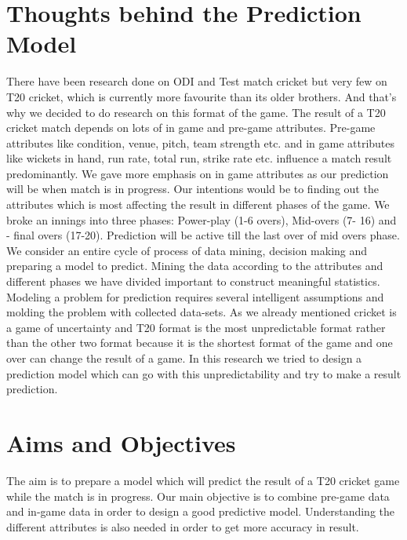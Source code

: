 \section{Thoughts behind the Prediction Model } 
There have been research done on ODI and Test match cricket but very few on T20 cricket, which is currently more favourite than its older brothers. And that's why we decided to do research on this format of the game. The result of a T20 cricket match depends on lots of in game and pre-game attributes. Pre-game attributes like condition, venue, pitch, team strength etc. and in game attributes like wickets in hand, run rate, total run, strike rate etc. influence a match result predominantly. We gave more emphasis on in game attributes as our prediction will be when match is in progress. Our intentions would be to finding out the attributes which is most affecting the result in different phases of the game. We broke an innings into three phases: Power-play (1-6 overs), Mid-overs (7- 16) and - final overs (17-20). Prediction will be active till the last over of mid overs phase. We consider an entire cycle of process of data mining, decision making and preparing a model to predict. Mining the data according to the attributes and different phases we have divided important to construct meaningful statistics. Modeling a problem for prediction requires several intelligent assumptions and molding the problem with collected data-sets. As we already mentioned cricket is a game of uncertainty and T20 format is the most unpredictable format rather than the other two format because it is the shortest format of the game and one over can change the result of a game. In this research we tried to design a prediction model which can go with this unpredictability and try to make a result prediction.
\section{Aims and Objectives }
The aim is to prepare a model which will predict the result of a T20 cricket game while the match is in progress. Our main objective is to combine pre-game data and in-game data in order to design a good predictive model. Understanding the different attributes is also needed in order to get more accuracy in result.
